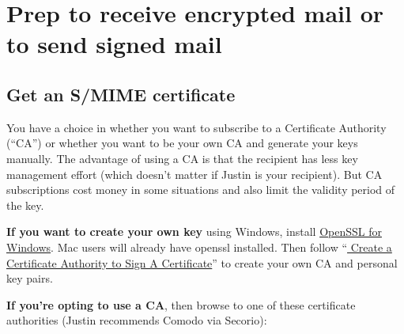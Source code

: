 \documentclass[pdftex,12pt,titlepage=false]{scrartcl}
\begin{document}
\section{Prep to receive encrypted mail or to send signed mail}

\subsection{Get an S/MIME certificate}\label{catable}
You have a choice in whether you want to subscribe to a Certificate
Authority (``CA'') or whether you want to be your own CA and generate
your keys manually.  The advantage of using a CA is that the recipient
has less key management effort (which doesn't matter if Justin is your
recipient).  But CA subscriptions cost money in some situations and
also limit the validity period of the key.

\textbf{If you want to create your own key} using Windows, install
\href{https://slproweb.com/products/Win32OpenSSL.html}{OpenSSL for
  Windows}.  Mac users will already have openssl installed.  Then
follow
``\href{https://www.howtoforge.com/how-to-encrypt-mails-with-ssl-certificates-s-mime#-alternative-create-a-certificate-authority-to-sign-a-certificate}{%
  Create a Certificate Authority to Sign A Certificate}'' to create
your own CA and personal key pairs.

\textbf{If you're opting to use a CA}, then browse to one of these
certificate authorities (Justin recommends Comodo via Secorio):\\
\end{document}
